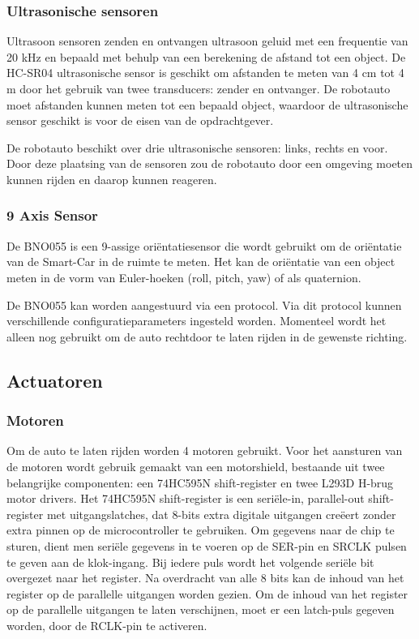 \subsubsection{Ultrasonische sensoren}
Ultrasoon sensoren zenden en ontvangen ultrasoon geluid met een frequentie van 20 kHz en bepaald met behulp van een berekening de afstand tot een object. De \gls{HC-SR04} ultrasonische sensor is geschikt om afstanden te meten van 4 cm tot 4 m door het gebruik van twee \gls{transducer}s: zender en ontvanger. De robotauto moet afstanden kunnen meten tot een bepaald object, waardoor de ultrasonische sensor geschikt is voor de eisen van de opdrachtgever\cite{HC-SR04}.

De robotauto beschikt over drie ultrasonische sensoren: links, rechts en voor. Door deze plaatsing van de sensoren zou de robotauto door een omgeving moeten kunnen rijden en daarop kunnen reageren. 

\subsubsection{9 Axis Sensor}
De \gls{BNO055}\cite{AXIS} is een 9-assige oriëntatiesensor die wordt gebruikt om de oriëntatie van de \gls{Smart-Car} in de ruimte te meten. Het kan de oriëntatie van een object meten in de vorm van Euler-hoeken (roll, pitch, yaw) of als quaternion.

De \gls{BNO055}\cite{AXIS} kan worden aangestuurd via een protocol. Via dit protocol kunnen verschillende configuratieparameters ingesteld worden. Momenteel wordt het alleen nog gebruikt om de auto rechtdoor te laten rijden in de gewenste richting. 
\subsection{Actuatoren}
\subsubsection{Motoren}
Om de auto te laten rijden worden 4 motoren gebruikt. Voor het aansturen van de motoren wordt gebruik gemaakt van een \gls{motorshield}, bestaande uit twee belangrijke componenten: een \gls{74HC595N} \gls{shift-register} en twee \gls{L293D} \gls{H-brug} motor drivers. Het \gls{74HC595N} \gls{shift-register} is een seriële-in, parallel-out \gls{shift-register} met uitgangslatches, dat 8-bits extra digitale uitgangen creëert zonder extra pinnen op de \gls{microcontroller} te gebruiken. Om gegevens naar de chip te sturen, dient men seriële gegevens in te voeren op de SER-pin en SRCLK pulsen te geven aan de klok-ingang. Bij iedere puls wordt het volgende seriële bit overgezet naar het \gls{register}. Na overdracht van alle 8 bits kan de inhoud van het \gls{register} op de parallelle uitgangen worden gezien. Om de inhoud van het \gls{register} op de parallelle uitgangen te laten verschijnen, moet er een latch-puls gegeven worden, door de RCLK-pin te activeren.

